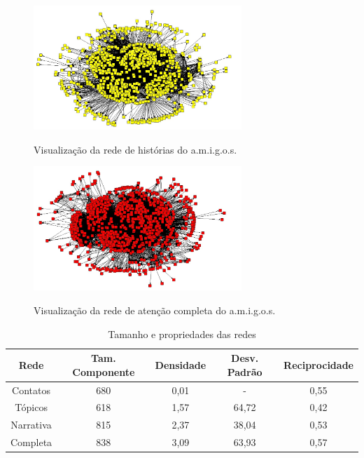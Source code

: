 \begin{figure}[h!]
  \caption{Visualização da rede de histórias do a.m.i.g.o.s.}
  \centering
    \includegraphics[width=0.7\textwidth]{imgs/narrativas.jpg}
    \label{ap:fig:narrativas}
\end{figure}

\begin{figure}[h!]
  \caption{Visualização da rede de atenção completa do a.m.i.g.o.s.}
  \centering
    \includegraphics[width=0.7\textwidth]{imgs/completa.jpg}
    \label{ap:fig:completa}
\end{figure}

\begin{table} [htbp]
	\large       %
	\setlength{\arrayrulewidth}{2\arrayrulewidth}  %
	\setlength{\belowcaptionskip}{10pt}  %
	\caption{Tamanho e propriedades das redes} \centering   %
	\begin{tabular}{| c | c | c | c | c |}
	\hline
	Rede & Tam. Componente & Densidade & Desv. Padrão & Reciprocidade \\ \hline
	Contatos & 680 & 0,01 & - & 0,55 \\
	Tópicos & 618 & 1,57 & 64,72 & 0,42\\
	Narrativa & 815 & 2,37 & 38,04 & 0,53\\
	Completa & 838 & 3,09 & 63,93 & 0,57\\ \hline
	\end{tabular}
	\label{ap:tab:estatisticas}
\end{table}

